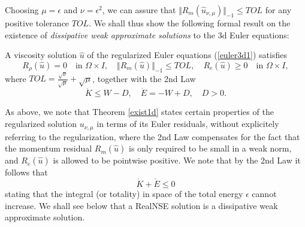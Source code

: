 Choosing $\mu =\epsilon$ and $\nu =\epsilon^2$, we can assure that
$\Vert R_m(\hat u_{\nu ,\mu})\Vert_{-1}\le TOL$ for 
any positive tolerance $TOL$.
We shall thus show the following formal result on the existence
of \emph{dissipative weak approximate solutions} to the 3d Euler equations:

\begin{theorem}\label{exist3d} 
A viscosity solution $\hat u$ of the regularized
Euler equations (\ref{euler3d1}) satisfies 
\[
R_\rho (\hat u)=0\quad \mbox{in }\Omega\times I,\quad 
\Vert R_m(\hat u)\Vert_{-1}\le TOL,\quad R_e(\hat u)\ge 0\quad\mbox{in }\Omega\times I ,
\]
where $TOL =\frac{\sqrt{\nu}}{\sqrt{\mu}}+\sqrt{\mu}$,
together with the 2nd Law
\begin{equation}\label{2ndlaw3d}
\dot K \le W-D,\quad \dot E =-W+D, \quad D>0.
\end{equation}
\end{theorem}

As above, we note that Theorem \ref{exist1d} states certain 
properties of the regularized solution $u_{\nu ,\mu}$ 
in terms of its Euler residuals, without
explicitely referring to the regularization,    
where the 2nd Law compensates for the 
fact that the momentum residual $R_m(\hat u)$ is only
required to be small in a weak norm, and $R_e(\hat u)$ is allowed
to be pointwise positive. We note that by the 2nd Law it follows
that
\begin{equation}\label{1stlaw}
\dot K+\dot E\le 0
\end{equation}
stating that the 
integral (or totality) in space of the total energy $\epsilon$ 
cannot increase. We shall see below that a RealNSE solution is a
dissipative weak approximate solution. 



